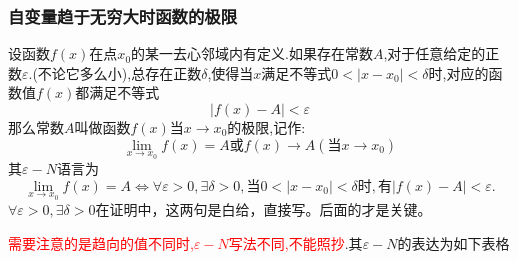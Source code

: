 \documentclass[12pt, a4paper, oneside, UTF8]{ctexbook}  %
\begin{document}
\subsubsection{自变量趋于无穷大时函数的极限}
\begin{defn}{}{}
    设函数$f(x)$在点$x_0$的某一去心邻域内有定义.如果存在常数$A$,对于任意给定的正数$\varepsilon$.(不论它多么小),总存在正数$\delta$,使得当$x$满足不等式$0<|x-x_0|<\delta$时,对应的函数值$f(x)$都满足不等式
    $$
        |f(x)-A|<\varepsilon
    $$
    那么常数$A$叫做函数$f(x)$当$x \to x_0$的极限,记作:
    $$
        \lim_{x\to x_0}f(x)=A\text{或}f(x)\to A(\text{当}x\to x_0)
    $$
    其$\varepsilon-N$语言为
    $$
        \lim\limits_{x\to x_0}f(x)=A\Leftrightarrow\forall\varepsilon>0,\exists\delta>0,\text{当}0<|x-x_0|<\delta\text{时},\text{有}|f(x)-A|<\varepsilon.
    $$
    $\forall\varepsilon>0,\exists\delta>0$在证明中，这两句是白给，直接写。后面的才是关键。
\end{defn}
\textcolor{red}{需要注意的是趋向的值不同时,$\varepsilon -N$写法不同,不能照抄}.其$\varepsilon -N$的表达为如下表格
\end{document}

